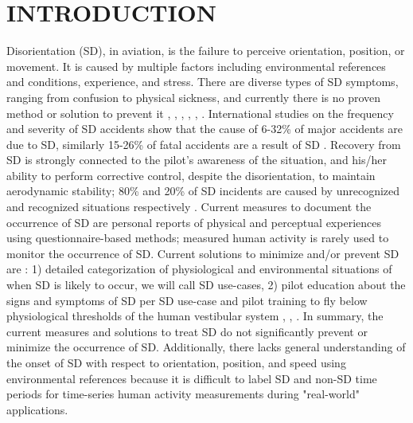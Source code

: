 \documentclass{ieeeaccess}
\begin{document}

\maketitle

\section{INTRODUCTION}
 Disorientation (SD), in aviation, is the failure to perceive orientation, position, or movement. It is caused by multiple factors including environmental references and conditions, experience, and stress. There are diverse types of SD symptoms, ranging from confusion to physical sickness, and currently there is no proven method or solution to prevent it \cite{Bles_2008_SD}, \cite{Gibb_2010_Aviation}, \cite{Perdriel_1980_SD}, \cite{Gillingham_1993_Spatial}, \cite{Previc_2004_Spatial}, \cite{Newman_2007_SD}.  International studies on the frequency and severity of SD accidents show that the cause of 6-32\% of major accidents are due to SD, similarly 15-26\% of fatal accidents are a result of SD \cite{Newman_2007_SD}. Recovery from SD is strongly connected to the pilot's awareness of the situation, and his/her ability to perform corrective control, despite the disorientation, to maintain aerodynamic stability; 80\% and 20\% of SD incidents are caused by unrecognized and recognized situations respectively \cite{Bles_2008_SD}. Current measures to document the occurrence of SD are personal reports of physical and perceptual experiences using questionnaire-based methods; measured human activity is rarely used to monitor the occurrence of SD. Current solutions to minimize and/or prevent SD are : 1) detailed categorization of physiological and environmental situations of when SD is likely to occur, we will call SD use-cases, 2) pilot education about the signs and symptoms of SD per SD use-case and pilot training to fly below physiological thresholds of the human vestibular system  \cite{Gillingham_1993_Spatial}, \cite{Newman_2007_SD}, \cite{Previc_2004_Spatial}. In summary, the current measures and solutions to treat SD do not significantly prevent or minimize the occurrence of SD. Additionally, there lacks general understanding of the onset of SD with respect to orientation, position, and speed using environmental references because it is difficult to label SD and non-SD time periods for time-series human activity measurements during "real-world" applications.
\end{document}
